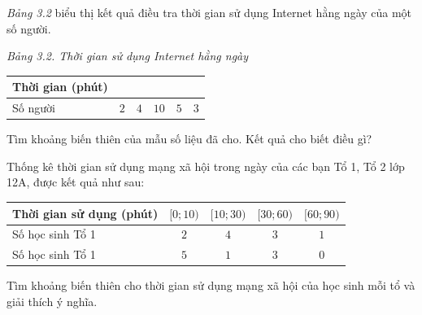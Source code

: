 \begin{bt}[Mức độ 2]%
{\it Bảng 3.2} biểu thị kết quả điều tra thời gian sử dụng Internet hằng ngày của một số người.
\begin{center}
	{\it Bảng 3.2. Thời gian sử dụng Internet hằng ngày}
	\begin{tabular}{|p{4cm}|p{2cm}|p{2cm}|p{2cm}|p{2cm}|p{2cm}|}
		\hline Thời gian (phút) &\centering\arraybackslash {$[30;60)$} &\centering\arraybackslash {$[60;90)$} &\centering\arraybackslash {$[90;120)$} &\centering\arraybackslash {$[120;150)$} &\centering\arraybackslash {$[150;180)$} \\
		\hline Số người &\centering\arraybackslash $2$ &\centering\arraybackslash $4$ &\centering\arraybackslash $10$ &\centering\arraybackslash $5$ &\centering\arraybackslash $3$ \\
		\hline
	\end{tabular}
\end{center}
Tìm khoảng biến thiên của mẫu số liệu đã cho. Kết quả cho biết điều gì?
\end{bt}

\begin{bt}[Mức độ 2]%
	Thống kê thời gian sử dụng mạng xã hội trong ngày của các bạn Tổ 1, Tổ 2 lớp 12A, được kết quả như sau:
	\begin{center}
		\begin{tabular}{|l|c|c|c|c|}
			\hline
			Thời gian sử dụng (phút) & $[0;10 )$ & $[ 10;30)$ &$[30;60 )$ & $[60;90)$ \\
			\hline
			Số học sinh Tổ 1 & $2$ & $4$ & $3$ & $1$ \\
			\hline
			Số học sinh Tổ 1 & $5$ & $1$ & $3$ & $0$ \\
			\hline
		\end{tabular}
	\end{center}
	Tìm khoảng biến thiên cho thời gian sử dụng mạng xã hội của học sinh mỗi tổ và giải thích ý nghĩa.
\end{bt}

